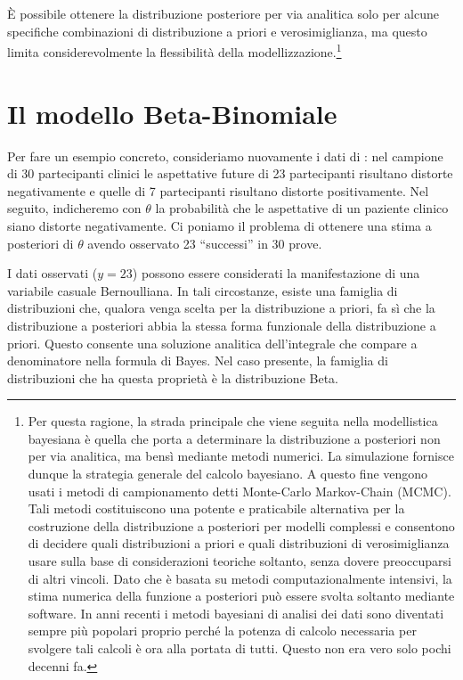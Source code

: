 \documentclass[
  10pt,
  italian,
  a4paper,
  extrafontsizes,onecolumn,openright
  ]{memoir}
\theoremstyle{definition}
\theoremstyle{definition}
\theoremstyle{definition}
\theoremstyle{definition}
\theoremstyle{remark}
\begin{document}
È possibile ottenere la distribuzione posteriore per via analitica solo per alcune specifiche combinazioni di distribuzione a priori e verosimiglianza, ma questo limita considerevolmente la flessibilità della modellizzazione.\footnote{Per questa ragione, la strada principale che viene seguita nella modellistica bayesiana è quella che porta a determinare la distribuzione a posteriori non per via analitica, ma bensì mediante metodi numerici. La simulazione fornisce dunque la strategia generale del calcolo bayesiano. A questo fine vengono usati i metodi di campionamento detti Monte-Carlo Markov-Chain (MCMC). Tali metodi costituiscono una potente e praticabile alternativa per la costruzione della distribuzione a posteriori per modelli complessi e consentono di decidere quali distribuzioni a priori e quali distribuzioni di verosimiglianza usare sulla base di considerazioni teoriche soltanto, senza dovere preoccuparsi di altri vincoli. Dato che è basata su metodi computazionalmente intensivi, la stima numerica della funzione a posteriori può essere svolta soltanto mediante software. In anni recenti i metodi bayesiani di analisi dei dati sono diventati sempre più popolari proprio perché la potenza di calcolo necessaria per svolgere tali calcoli è ora alla portata di tutti. Questo non era vero solo pochi decenni fa.}

\hypertarget{chapter-distr-priori-coniugate}{%
\section{Il modello Beta-Binomiale}\label{chapter-distr-priori-coniugate}}

Per fare un esempio concreto, consideriamo nuovamente i dati di \textcite{zetschefuture2019}: nel campione di 30 partecipanti clinici le aspettative future di 23 partecipanti risultano distorte negativamente e quelle di 7 partecipanti risultano distorte positivamente. Nel seguito, indicheremo con \(\theta\) la probabilità che le aspettative di un paziente clinico siano distorte negativamente. Ci poniamo il problema di ottenere una stima a posteriori di \(\theta\) avendo osservato 23 ``successi'' in 30 prove.

I dati osservati (\(y = 23\)) possono essere considerati la manifestazione di una variabile casuale Bernoulliana. In tali circostanze, esiste una famiglia di distribuzioni che, qualora venga scelta per la distribuzione a priori, fa sì che la distribuzione a posteriori abbia la stessa forma funzionale della distribuzione a priori. Questo consente una soluzione analitica dell'integrale che compare a denominatore nella formula di Bayes. Nel caso presente, la famiglia di distribuzioni che ha questa proprietà è la distribuzione Beta.
\end{document}
